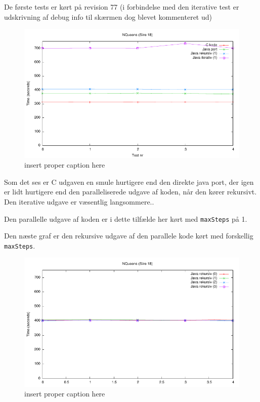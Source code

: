 De første tests er kørt på revision 77 (i forbindelse med den iterative test er
udskrivning af debug info til skærmen dog blevet kommenteret ud)

\begin{figure}[h]
\begin{center}
\includegraphics{../benchmarks/b1.pdf}
\caption{insert proper caption here } 
\label{plot:b1}
\end{center}
\end{figure}

Som det ses er C udgaven en smule hurtigere end den direkte java port, der igen
er lidt hurtigere end den paralleliserede udgave af koden, når den kører
rekursivt. Den iterative udgave er væsentlig langsommere..

Den parallelle udgave af koden er i dette tilfælde her kørt med
\texttt{maxSteps} på 1. 

Den næste graf er den rekursive udgave af den parallele kode kørt med forskellig
\texttt{maxSteps}. 

\begin{figure}[h]
\begin{center}
\includegraphics{../benchmarks/b2.pdf}
\caption{insert proper caption here } 
\label{plot:b2}
\end{center}
\end{figure}

